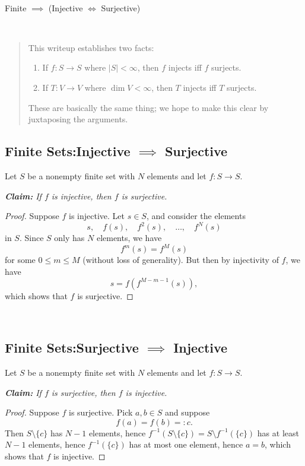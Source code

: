 \documentclass[12pt]{memoir}
\def\inv{^{-1}}
\begin{document}
~\\[0em]
\begin{center}
\Large Finite $\implies$ (Injective $\iff$ Surjective)
\end{center}
~\\[-2em]
\begin{abstract}
\noindent 
This writeup establishes two facts:
\begin{enumerate}
\item If $f:S\to S$ where $|S| < \infty$,
then $f$ injects iff $f$ surjects.
\item If $T:V\to V$ where $\dim V < \infty$,
then $T$ injects iff $T$ surjects.
\end{enumerate}
These are basically the same thing; we hope to make this
clear by juxtaposing the arguments.
\end{abstract}
\subsection*{Finite Sets:\quad Injective $\implies$ Surjective}
Let $S$ be a nonempty finite set with $N$ elements and let $f:S\to S$.
\begin{center}
\textit{\textbf{Claim:} If $f$ is injective, then $f$ is surjective.}
\end{center}
\begin{proof}
Suppose $f$ is injective.
Let $s\in S$, and consider the elements
\[s,\quad f(s),\quad f^2(s),\quad\dots,\quad f^N(s)\]
in $S$. Since $S$ only has $N$ elements, we have
\[f^m(s) = f^M(s)\]
for some $0\le m\le M$ (without loss of generality).
But then by injectivity of $f$, we have
\[s = f(f^{M - m - 1}(s)),\]
which shows that $f$ is surjective.
\end{proof}
~\\[-2.5em]
\subsection*{Finite Sets:\quad Surjective $\implies$ Injective}
Let $S$ be a nonempty finite set with $N$ elements and let $f:S\to S$.
\begin{center}
\textit{\textbf{Claim:} If $f$ is surjective, then $f$ is injective.}
\end{center}
\begin{proof}
Suppose $f$ is surjective. Pick $a, b\in S$ and suppose
\[f(a) = f(b) =: c.\] Then $S\setminus\{c\}$ has $N - 1$ elements,
hence $f\inv(S\setminus\{c\}) = S\setminus f\inv(\{c\})$ has at least
$N - 1$ elements, hence $f\inv(\{c\})$ has at most one element,
hence $a = b$, which shows that $f$ is injective.
\end{proof}
~\\[-2.5em]
\end{document}
